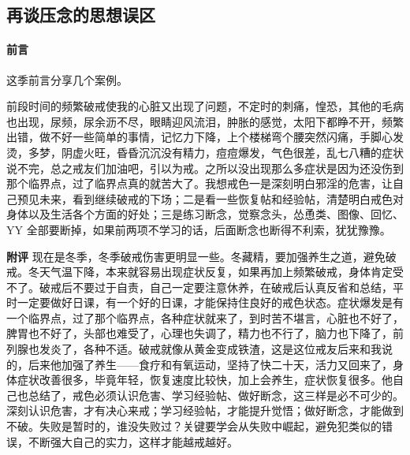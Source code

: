 \subsection{再谈压念的思想误区}

\paragraph{前言}

这季前言分享几个案例。

\begin{case}
    前段时间的频繁破戒使我的心脏又出现了问题，不定时的刺痛，惶恐，其他的毛病也出现，尿频，尿余沥不尽，眼睛迎风流泪，肿胀的感觉，太阳下都睁不开，频繁出错，做不好一些简单的事情，记忆力下降，上个楼梯弯个腰突然闪痛，手脚心发烫，多梦，阴虚火旺，昏昏沉沉没有精力，痘痘爆发，气色很差，乱七八糟的症状说不完，总之戒友们加油吧，引以为戒。之所以没出现那么多症状是因为还没伤到那个临界点，过了临界点真的就苦大了。我想戒色一是深刻明白邪淫的危害，让自己预见未来，看到继续破戒的下场；二是看一些恢复帖和经验帖，清楚明白戒色对身体以及生活各个方面的好处；三是练习断念，觉察念头，怂恿类、图像、回忆、YY 全部要断掉，如果前两项不学习的话，后面断念也断得不利索，犹犹豫豫。

    \textbf{附评} 现在是冬季，冬季破戒伤害更明显一些。冬藏精，要加强养生之道，避免破戒。冬天气温下降，本来就容易出现症状反复，如果再加上频繁破戒，身体肯定受不了。破戒后不要过于自责，自己一定要注意休养，在破戒后认真反省和总结，平时一定要做好日课，有一个好的日课，才能保持住良好的戒色状态。症状爆发是有一个临界点，过了那个临界点，各种症状就来了，到时苦不堪言，心脏也不好了，脾胃也不好了，头部也难受了，心理也失调了，精力也不行了，脑力也下降了，前列腺也发炎了，各种不适。破戒就像从黄金变成铁渣，这是这位戒友后来和我说的，后来他加强了养生——食疗和有氧运动，坚持了快二十天，活力又回来了，身体症状改善很多，毕竟年轻，恢复速度比较快，加上会养生，症状恢复很多。他自己也总结了，戒色必须认识危害、学习经验帖、做好断念，这三样是必不可少的。深刻认识危害，才有决心来戒；学习经验帖，才能提升觉悟；做好断念，才能做到不破。失败是暂时的，谁没失败过？关键要学会从失败中崛起，避免犯类似的错误，不断强大自己的实力，这样才能越戒越好。
\end{case}

